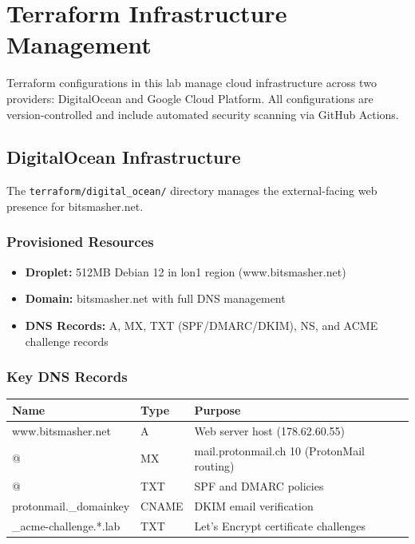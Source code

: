 
\chapter{Terraform Infrastructure Management}

Terraform configurations in this lab manage cloud infrastructure across two providers: DigitalOcean and Google Cloud Platform. All configurations are version-controlled and include automated security scanning via GitHub Actions.

\section{DigitalOcean Infrastructure}

The \texttt{terraform/digital\_ocean/} directory manages the external-facing web presence for bitsmasher.net.

\subsection{Provisioned Resources}

\begin{itemize}
    \item \textbf{Droplet:} 512MB Debian 12 in lon1 region (www.bitsmasher.net)
    \item \textbf{Domain:} bitsmasher.net with full DNS management
    \item \textbf{DNS Records:} A, MX, TXT (SPF/DMARC/DKIM), NS, and ACME challenge records
\end{itemize}

\subsection{Key DNS Records}

\begin{center}
\begin{tabular}{lll}
\hline
Name & Type & Purpose \\ \hline
www.bitsmasher.net & A & Web server host (178.62.60.55) \\
@ & MX & mail.protonmail.ch 10 (ProtonMail routing) \\
@ & TXT & SPF and DMARC policies \\
protonmail.\_domainkey & CNAME & DKIM email verification \\
\_acme-challenge.*.lab & TXT & Let's Encrypt certificate challenges \\ \hline
\end{tabular}
\end{center}


